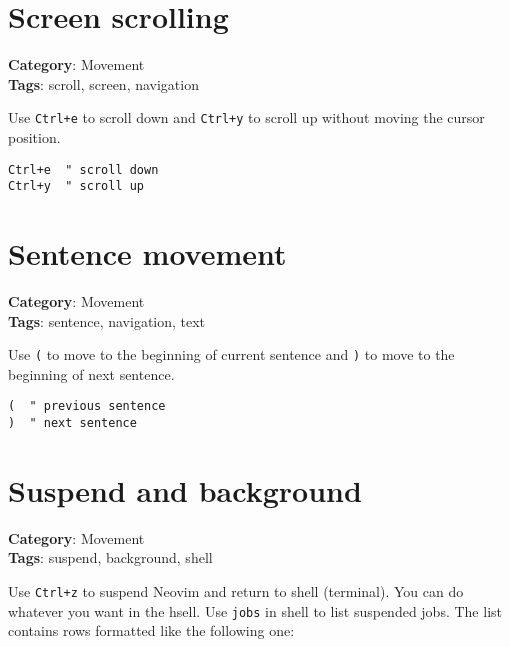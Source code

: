 {{{{{{{{\section{Screen scrolling}

\textbf{Category}: Movement\\ \textbf{Tags}: scroll, screen, navigation
\vspace{0.5cm}

Use {\footnotesize \Verb§Ctrl+e§} to scroll down and {\footnotesize \Verb§Ctrl+y§} to scroll up without moving the cursor position.

\begin{Exa*}{}
\begin{Verbatim}[fontsize=\footnotesize, breaklines, breakanywhere]
Ctrl+e  " scroll down
Ctrl+y  " scroll up
\end{Verbatim}
\end{Exa*}

\section{Sentence movement}

\textbf{Category}: Movement\\ \textbf{Tags}: sentence, navigation, text
\vspace{0.5cm}

Use {\footnotesize \Verb§(§} to move to the beginning of current sentence and {\footnotesize \Verb§)§} to move to the beginning of next sentence.

\begin{Exa*}{}
\begin{Verbatim}[fontsize=\footnotesize, breaklines, breakanywhere]
(  " previous sentence
)  " next sentence
\end{Verbatim}
\end{Exa*}

\section{Suspend and background}

\textbf{Category}: Movement\\ \textbf{Tags}: suspend, background, shell
\vspace{0.5cm}

Use {\footnotesize \Verb§Ctrl+z§} to suspend Neovim and return to shell (terminal). You can do whatever you want in the hsell. Use {\footnotesize \Verb§jobs§} in shell to list suspended jobs. The list contains rows formatted like the following one:

}}}}}}}}
